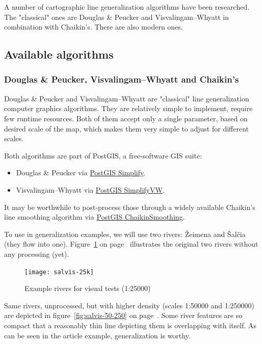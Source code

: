 \documentclass[a4paper]{article}
\newcommand{\onpage}[1]{\ref{#1} on page~\pageref{#1}}
\newcommand{\DP}{Douglas \& Peucker}
\newcommand{\VW}{Visvalingam--Whyatt}
\begin{document}
A number of cartographic line generalization algorithms have been researched.
The "classical" ones are {\DP} and {\VW} in combination with Chaikin's. There
are also modern ones.

\subsection{Available algorithms}

\subsubsection{{\DP}, {\VW} and Chaikin's}

{\DP} \cite{douglas1973algorithms} and {\VW} \cite{visvalingam1993line} are
"classical" line generalization computer graphics algorithms. They are
relatively simple to implement, require few runtime resources. Both of them
accept only a single parameter, based on desired scale of the map, which makes
them very simple to adjust for different scales.

Both algorithms are part of PostGIS, a free-software GIS suite:
\begin{itemize}
    \item {\DP} via
        \href{https://postgis.net/docs/ST_Simplify.html}{PostGIS Simplify}.

    \item {\VW} via
        \href{https://postgis.net/docs/ST_SimplifyVW.html}{PostGIS SimplifyVW}.
\end{itemize}

It may be worthwhile to post-process those through a widely available Chaikin's
line smoothing algorithm \cite{chaikin1974algorithm} via
\href{https://postgis.net/docs/ST_ChaikinSmoothing.html}{PostGIS
ChaikinSmoothing}.

To use in generalization examples, we will use two rivers: Žeimena and Šalčia
(they flow into one). Figure~\onpage{fig:salvis-25} illustrates the original
two rivers without any processing (yet).

\begin{figure}[h]
    \centering
    \texttt{[image: salvis-25k]}
    \caption{Example rivers for visual tests (1:25000)}
    \label{fig:salvis-25}
\end{figure}

Same rivers, unprocessed, but with higher density (scales 1:50000 and 1:250000)
are depicted in figure~\onpage{fig:salvis-50-250}. Some river features are so
compact that a reasonably thin line depicting them is overlapping with itself.
As can be seen in the article example, generalization is worthy.
\end{document}
